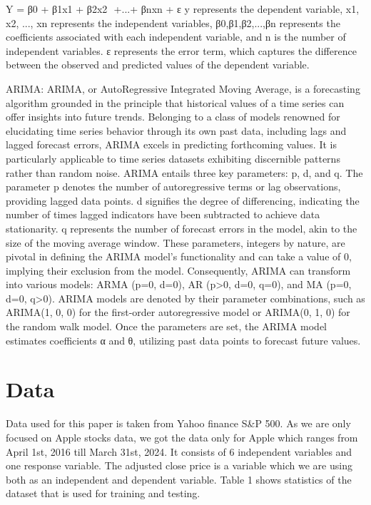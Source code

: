 \documentclass[conference,onecolumn,11pt]{IEEEtran}
\begin{document}
Y = β0 + β1x1 + β2​x2 ​ +...+ βn​xn +  ε
y represents the dependent variable, x1, x2, ..., xn represents the independent variables, β0,β1,β2,...,βn represents the coefficients associated with each independent variable, and n is the number of independent variables. ε represents the error term, which captures the difference between the observed and predicted values of the dependent variable.


ARIMA:
ARIMA, or AutoRegressive Integrated Moving Average, is a forecasting algorithm grounded in the principle that historical values of a time series can offer insights into future trends. Belonging to a class of models renowned for elucidating time series behavior through its own past data, including lags and lagged forecast errors, ARIMA excels in predicting forthcoming values. It is particularly applicable to time series datasets exhibiting discernible patterns rather than random noise. ARIMA entails three key parameters: p, d, and q. The parameter p denotes the number of autoregressive terms or lag observations, providing lagged data points. d signifies the degree of differencing, indicating the number of times lagged indicators have been subtracted to achieve data stationarity. q represents the number of forecast errors in the model, akin to the size of the moving average window. These parameters, integers by nature, are pivotal in defining the ARIMA model's functionality and can take a value of 0, implying their exclusion from the model. Consequently, ARIMA can transform into various models: ARMA (p=0, d=0), AR (p>0, d=0, q=0), and MA (p=0, d=0, q>0). ARIMA models are denoted by their parameter combinations, such as ARIMA(1, 0, 0) for the first-order autoregressive model or ARIMA(0, 1, 0) for the random walk model. Once the parameters are set, the ARIMA model estimates coefficients α and θ, utilizing past data points to forecast future values.

\section{Data}
Data used for this paper is taken from Yahoo finance S&P 500. As we are only focused on Apple stocks data, we got the data only for Apple which ranges from April 1st, 2016 till March 31st, 2024. It consists of 6 independent variables and one response variable. The adjusted close price is a variable which we are using both as an independent and dependent variable. Table 1 shows statistics of the dataset that is used for training and testing.
\end{document}
